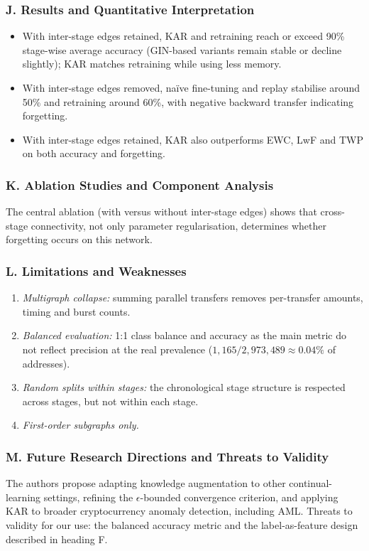 \documentclass[11pt,a4paper]{article}
\begin{document}
\subsubsection*{J. Results and Quantitative Interpretation}
\begin{itemize}[leftmargin=*]
    \item With inter-stage edges retained, KAR and retraining reach or exceed 90\% stage-wise average accuracy (GIN-based variants remain stable or decline slightly); KAR matches retraining while using less memory.
    \item With inter-stage edges removed, naïve fine-tuning and replay stabilise around 50\% and retraining around 60\%, with negative backward transfer indicating forgetting.
    \item With inter-stage edges retained, KAR also outperforms EWC, LwF and TWP on both accuracy and forgetting.
\end{itemize}

\subsubsection*{K. Ablation Studies and Component Analysis}
The central ablation (with versus without inter-stage edges) shows that cross-stage connectivity, not only parameter regularisation, determines whether forgetting occurs on this network.

\subsubsection*{L. Limitations and Weaknesses}
\begin{enumerate}[leftmargin=*]
    \item \textit{Multigraph collapse:} summing parallel transfers removes per-transfer amounts, timing and burst counts.
    \item \textit{Balanced evaluation:} 1:1 class balance and accuracy as the main metric do not reflect precision at the real prevalence ($1{,}165/2{,}973{,}489 \approx 0.04\%$ of addresses).
    \item \textit{Random splits within stages:} the chronological stage structure is respected across stages, but not within each stage.
    \item \textit{First-order subgraphs only.}
\end{enumerate}

\subsubsection*{M. Future Research Directions and Threats to Validity}
The authors propose adapting knowledge augmentation to other continual-learning settings, refining the $\epsilon$-bounded convergence criterion, and applying KAR to broader cryptocurrency anomaly detection, including AML. Threats to validity for our use: the balanced accuracy metric and the label-as-feature design described in heading F.
\end{document}
